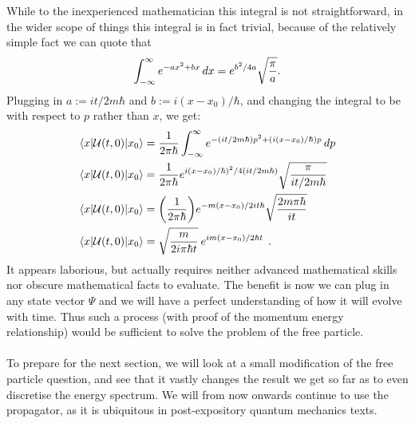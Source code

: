 While to the inexperienced mathematician this integral is not straightforward, in the wider scope of things this integral is in fact trivial, because of the relatively simple fact we can quote that 
$$
\int_{-\infty}^{\infty} e^{-ax^2+bx}\,dx=e^{b^2/4a}\sqrt{\frac{\pi}{a}}.
$$
Plugging in $a:=it/2m\hbar$ and $b:=i(x-x_{0})/\hbar$, and changing the integral to be with respect to $p$ rather than $x$, we get:
$$
\begin{aligned}
\langle x|\mathcal{U}(t,0)|x_{0}\rangle&=\frac{1}{2\pi\hbar}\int_{-\infty}^{\infty} e^{-(it/2m\hbar)p^{2}+(i(x-x_{0})/\hbar)p}\,dp\\
\langle x|\mathcal{U}(t,0)|x_{0}\rangle&=\frac{1}{2\pi\hbar}e^{i(x-x_{0})/\hbar)^2/4(it/2m\hbar)}\sqrt{\frac{\pi}{it/2m\hbar}}\\
\langle x|\mathcal{U}(t,0)|x_{0}\rangle&=\biggl(\frac{1}{2\pi\hbar}\biggr)e^{-m(x-x_{0})/2it\hbar}\sqrt{\frac{2m\pi\hbar}{it}}\\
\langle x|\mathcal{U}(t,0)|x_{0}\rangle&=\sqrt{\frac{m}{2i\pi\hbar t}}\:e^{im(x-x_{0})/2\hbar t}\:\:.
\end{aligned}
$$
It appears laborious, but actually requires neither advanced mathematical skills nor obscure mathematical facts to evaluate. The benefit is now we can plug in any state vector $\Psi$ and we will have a perfect understanding of how it will evolve with time. Thus such a process (with proof of the momentum energy relationship) would be sufficient to solve the problem of the free particle. 
\\\\
To prepare for the next section, we will look at a small modification of the free particle question, and see that it vastly changes the result we get so far as to even discretise the energy spectrum. We will from now onwards continue to use the propagator, as it is ubiquitous in post-expository quantum mechanics texts.

